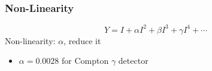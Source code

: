 \subsubsection{Non-Linearity}
\begin{equation}
    Y = I + \alpha I^2 + \beta I^3 + \gamma I^4 + \cdots
\end{equation}
Non-linearity: $\alpha$, reduce it 
\begin{itemize}
    \item $\alpha=0.0028$ for Compton $\gamma$ detector
\end{itemize}
